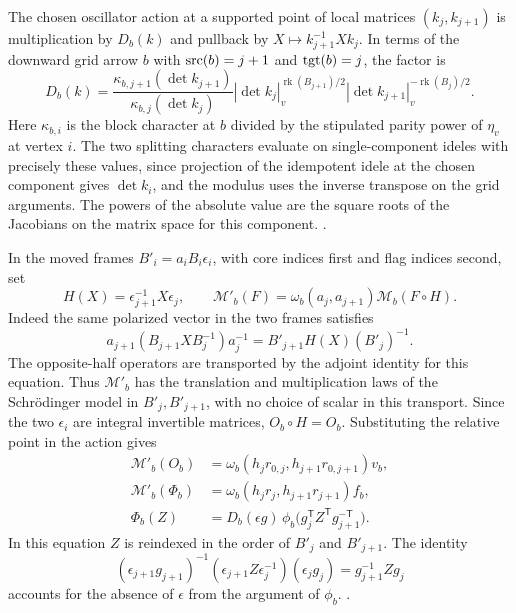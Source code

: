 The chosen oscillator action at a supported point of local matrices
\((k_j,k_{j+1})\) is multiplication by \(D_b(k)\) and pullback by
\(X\mapsto k_{j+1}^{-1}Xk_j\). In terms of the downward grid arrow
\(b\) with \({\rm src}(b)=j+1\) and \({\rm tgt}(b)=j\), the factor is
\[
 D_b(k)=
 \frac{\kappa_{b,j+1}(\det k_{j+1})}{\kappa_{b,j}(\det k_j)}
 |\det k_j|_v^{\operatorname{rk}(B_{j+1})/2}
 |\det k_{j+1}|_v^{-\operatorname{rk}(B_j)/2}.
\]
Here \(\kappa_{b,i}\) is the block character at \(b\) divided by
the stipulated parity power of \(\eta_v\) at vertex \(i\).
The two splitting characters evaluate on single-component ideles
with precisely these values, since projection of the idempotent
idele at the chosen component gives \(\det k_i\), and the modulus
uses the inverse transpose on the grid arguments. The powers of
the absolute value are the square roots of the Jacobians on the
matrix space for this component.
.

In the moved frames \(B'_i=a_iB_i\epsilon_i\), with core indices
first and flag indices second, set
\[
 H(X)=\epsilon_{j+1}^{-1}X\epsilon_j,\qquad
 \mathcal M'_b(F)=\omega_b(a_j,a_{j+1})\mathcal M_b(F\circ H).
\]
Indeed the same polarized vector in the two frames satisfies
\[
 a_{j+1}(B_{j+1}X B_j^{-1})a_j^{-1}
       =B'_{j+1} H(X) (B'_j)^{-1}.
\]
The opposite-half operators are transported by the adjoint
identity for this equation. Thus \(\mathcal M'_b\) has the
translation and multiplication laws of the Schr\"odinger
model in \(B'_j,B'_{j+1}\), with no choice of scalar in this
transport. Since the two \(\epsilon_i\) are integral invertible
matrices, \(O_b\circ H=O_b\). Substituting the relative point
in the action gives
\[
 \begin{split}
 \mathcal M'_b(O_b)&=\omega_b(h_jr_{0,j},h_{j+1}r_{0,j+1})v_b,\\
 \mathcal M'_b(\Phi_b)&=\omega_b(h_jr_j,h_{j+1}r_{j+1})f_b,\\
 \Phi_b(Z)&=D_b(\epsilon g)\,
     \phi_b\bigl(g_j^{\mathsf T}Z^{\mathsf T}g_{j+1}^{-\mathsf T}\bigr).
 \end{split}
\]
In this equation \(Z\) is reindexed in the order of \(B'_j\) and
\(B'_{j+1}\). The identity
\[
 (\epsilon_{j+1}g_{j+1})^{-1}
       (\epsilon_{j+1}Z\epsilon_j^{-1})(\epsilon_j g_j)
 =g_{j+1}^{-1}Zg_j
\]
accounts for the absence of \(\epsilon\) from the argument of
\(\phi_b\).
.

